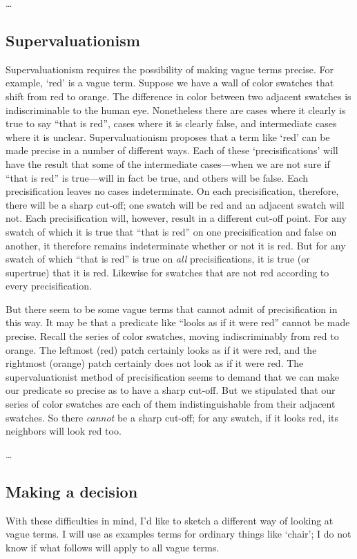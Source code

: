 \documentclass[11pt]{article}
\begin{document}
\begin{spacing}{1.5}
\ldots

\subsection{Supervaluationism}
Supervaluationism requires the possibility of making vague terms
precise.  For example, `red' is a vague term.  Suppose we have a wall
of color swatches that shift from red to orange.  The difference in
color between two adjacent swatches is indiscriminable to the human
eye.  Nonetheless there are cases where it clearly is true to say
``that is red'', cases where it is clearly false, and intermediate
cases where it is unclear.  Supervaluationism proposes that a term
like `red' can be made precise in a number of different ways.  Each of
these `precisifications' will have the result that some of the
intermediate cases---when we are not sure if ``that is red'' is
true---will in fact be true, and others will be false.  Each
precisification leaves no cases indeterminate.  On each
precisification, therefore, there will be a sharp cut-off; one swatch
will be red and an adjacent swatch will not.  Each precisification
will, however, result in a different cut-off point.  For any swatch of
which it is true that ``that is red'' on one precisification and false
on another, it therefore remains indeterminate whether or not it is
red.  But for any swatch of which ``that is red'' is true on {\em all}
precisifications, it is true (or supertrue) that it is red.  Likewise
for swatches that are not red according to every precisification.

But there seem to be some vague terms that cannot admit of
precisification in this way.  It may be that a predicate like ``looks
as if it were red'' cannot be made precise.  Recall the series of
color swatches, moving indiscriminably from red to orange.  The
leftmost (red) patch certainly looks as if it were red, and the
rightmost (orange) patch certainly does not look as if it were red.
The supervaluationist method of precisification seems to demand that
we can make our predicate so precise as to have a sharp cut-off.  But
we stipulated that our series of color swatches are each of them
indistinguishable from their adjacent swatches.  So there {\em cannot}
be a sharp cut-off; for any swatch, if it looks red, its neighbors
will look red too.

\ldots

\subsection{Making a decision}
With these difficulties in mind, I'd like to sketch a different way of
looking at vague terms.  I will use as examples terms for ordinary
things like `chair'; I do not know if what follows will apply to all
vague terms.


\end{spacing}
\end{document}
